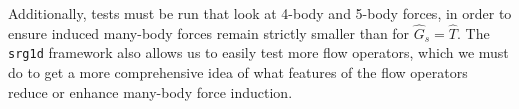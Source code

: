 Additionally, tests must be run that look at 4-body and 5-body forces, in order to ensure induced many-body forces remain strictly smaller than for $\hat{G}_s=\hat{T}$. The \texttt{srg1d} framework also allows us to easily test more flow operators, which we must do to get a more comprehensive idea of what features of the flow operators reduce or enhance many-body force induction.


